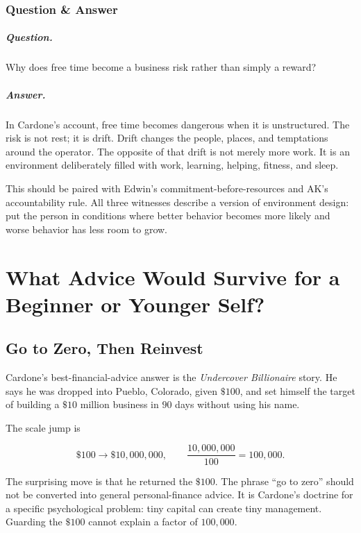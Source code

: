 \documentclass[11pt,oneside]{book}
\begin{document}
\subsection{Question \& Answer}

\paragraph{Question.}
Why does free time become a business risk rather than simply a reward?

\paragraph{Answer.}
In Cardone's account, free time becomes dangerous when it is unstructured. The risk is not rest; it is drift. Drift changes the people, places, and temptations around the operator. The opposite of that drift is not merely more work. It is an environment deliberately filled with work, learning, helping, fitness, and sleep.

This should be paired with Edwin's commitment-before-resources and AK's accountability rule. All three witnesses describe a version of environment design: put the person in conditions where better behavior becomes more likely and worse behavior has less room to grow.

\chapter{What Advice Would Survive for a Beginner or Younger Self?}

\section{Go to Zero, Then Reinvest}

Cardone's best-financial-advice answer is the \emph{Undercover Billionaire} story. He says he was dropped into Pueblo, Colorado, given \(\$100\), and set himself the target of building a \(\$10\) million business in \(90\) days without using his name.

The scale jump is

\begin{equation}
\$100\longrightarrow \$10{,}000{,}000,
\qquad
\frac{10{,}000{,}000}{100}=100{,}000.
\end{equation}

The surprising move is that he returned the \(\$100\). The phrase ``go to zero'' should not be converted into general personal-finance advice. It is Cardone's doctrine for a specific psychological problem: tiny capital can create tiny management. Guarding the \(\$100\) cannot explain a factor of \(100{,}000\).
\end{document}
